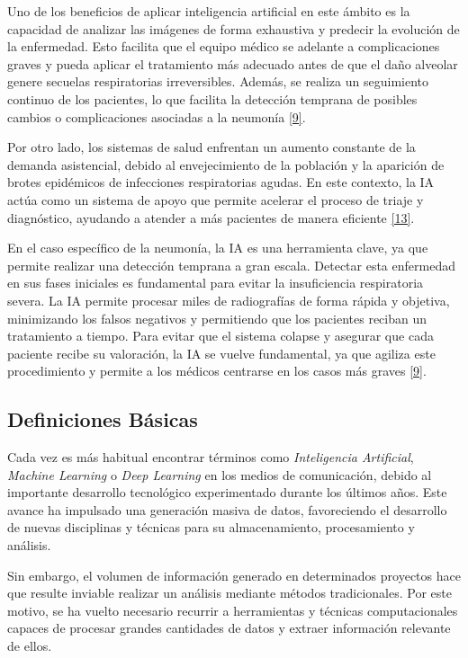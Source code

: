 \documentclass[11pt, a4paper]{article}
\numberwithin{equation}{section}
\begin{document}
Uno de los beneficios de aplicar inteligencia artificial en este ámbito es la capacidad de analizar las imágenes de forma exhaustiva y predecir la evolución de la enfermedad. Esto facilita que el equipo médico se adelante a complicaciones graves y pueda aplicar el tratamiento más adecuado antes de que el daño alveolar genere secuelas respiratorias irreversibles. Además, se realiza un seguimiento continuo de los pacientes, lo que facilita la detección temprana de posibles cambios o complicaciones asociadas a la neumonía \hyperlink{ref:9}{[9]}.

Por otro lado, los sistemas de salud enfrentan un aumento constante de la demanda asistencial, debido al envejecimiento de la población y la aparición de brotes epidémicos de infecciones respiratorias agudas. En este contexto, la IA actúa como un sistema de apoyo que permite acelerar el proceso de triaje y diagnóstico, ayudando a atender a más pacientes de manera eficiente \hyperlink{ref:13}{[13]}.

En el caso específico de la neumonía, la IA es una herramienta clave, ya que permite realizar una detección temprana a gran escala. Detectar esta enfermedad en sus fases iniciales es fundamental para evitar la insuficiencia respiratoria severa. La IA permite procesar miles de radiografías de forma rápida y objetiva, minimizando los falsos negativos y permitiendo que los pacientes reciban un tratamiento a tiempo. Para evitar que el sistema colapse y asegurar que cada paciente recibe su valoración, la IA se vuelve fundamental, ya que agiliza este procedimiento y permite a los médicos centrarse en los casos más graves \hyperlink{ref:9}{[9]}.

\newpage
\subsection{Definiciones Básicas}
\label{sec:definiciones_basicas}

Cada vez es más habitual encontrar términos como \textit{Inteligencia Artificial}, \textit{Machine Learning} o \textit{Deep Learning} en los medios de comunicación, debido al importante desarrollo tecnológico experimentado durante los últimos años. Este avance ha impulsado una generación masiva de datos, favoreciendo el desarrollo de nuevas disciplinas y técnicas para su almacenamiento, procesamiento y análisis.

Sin embargo, el volumen de información generado en determinados proyectos hace que resulte inviable realizar un análisis mediante métodos tradicionales. Por este motivo, se ha vuelto necesario recurrir a herramientas y técnicas computacionales capaces de procesar grandes cantidades de datos y extraer información relevante de ellos.
\end{document}
